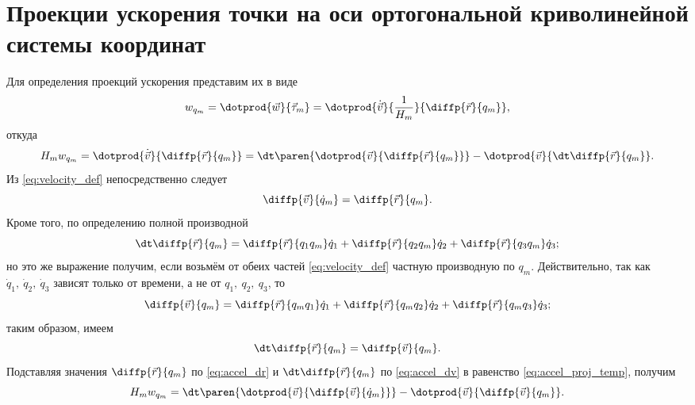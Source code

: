 \section{Проекции ускорения точки на оси ортогональной криволинейной системы
координат}

Для определения проекций ускорения представим их в виде
\begin{equation*}
  w_{q_m} = \dotprod{\vec{w}}{\vec{\tau}_m} =
    \dotprod{\dot{\vec{v}}}{\frac{1}{H_m}}{\diffp{\vec{r}}{{q_m}}},
\end{equation*}
откуда
\begin{equation}
  \label{eq:accel_proj_temp}
  H_m w_{q_m} = \dotprod{\dot{\vec{v}}}{\diffp{\vec{r}}{{q_m}}} =
    \dt \paren{\dotprod{\vec{v}}{\diffp{\vec{r}}{{q_m}}}}
    - \dotprod{\vec{v}}{\dt \diffp{\vec{r}}{{q_m}}}.
\end{equation}
Из \autoref{eq:velocity_def} непосредственно следует
\begin{equation}
  \label{eq:accel_dr}
  \diffp{\vec{v}}{{\dot{q}_m}} = \diffp{\vec{r}}{{q_m}}.
\end{equation}
Кроме того, по определению полной производной
\begin{equation*}
  \dt \diffp{\vec{r}}{{q_m}} = \diffp{\vec{r}}{{q_1}{q_m}} \dot{q}_1 +
    \diffp{\vec{r}}{{q_2}{q_m}} \dot{q}_2 +
    \diffp{\vec{r}}{{q_3}{q_m}} \dot{q}_3;
\end{equation*}
но это же выражение получим, если возьмём от обеих частей
\autoref{eq:velocity_def} частную производную по $q_m$. Действительно, так как
$\dot{q}_1,~\dot{q}_2,~\dot{q}_3$ зависят только от времени, а не от
$q_1,~q_2,~q_3$, то
\begin{equation*}
  \diffp{\vec{v}}{{q_m}} = \diffp{\vec{r}}{{q_m}{q_1}} \dot{q}_1 +
    \diffp{\vec{r}}{{q_m}{q_2}} \dot{q}_2 + \diffp{\vec{r}}{{q_m}{q_3}}
    \dot{q}_3;
\end{equation*}
таким образом, имеем
\begin{equation}
  \label{eq:accel_dv}
  \dt \diffp{\vec{r}}{{q_m}} = \diffp{\vec{v}}{{q_m}}.
\end{equation}
Подставляя значения $\diffp{\vec{r}}{{q_m}}$ по \autoref{eq:accel_dr} и
$\dt \diffp{\vec{r}}{{q_m}}$ по \autoref{eq:accel_dv} в равенство
\ref{eq:accel_proj_temp}, получим
\begin{equation}
  \label{eq:accel_proj_temp2}
  H_m w_{q_m} = \dt \paren{\dotprod{\vec{v}}{\diffp{\vec{v}}{{\dot{q}_m}}}} -
    \dotprod{\vec{v}}{\diffp{\vec{v}}{{q_m}}}.
\end{equation}
